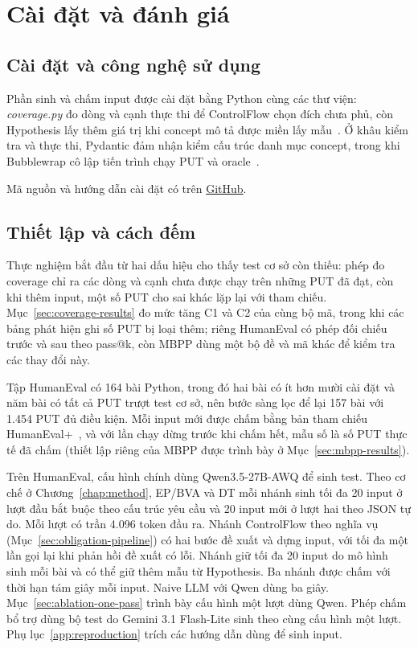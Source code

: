 \chapter{Cài đặt và đánh giá}
\label{chap:experiment}

\section{Cài đặt và công nghệ sử dụng}
\label{sec:related-technologies}

Phần sinh và chấm input được cài đặt bằng Python cùng các thư viện: \textit{coverage.py} đo dòng và cạnh thực thi để ControlFlow chọn đích chưa phủ, còn Hypothesis lấy thêm giá trị khi concept mô tả được miền lấy mẫu~\cite{coverageBranchDocs,hypothesisIntroDocs}. Ở khâu kiểm tra và thực thi, Pydantic đảm nhận kiểm cấu trúc danh mục concept, trong khi Bubblewrap cô lập tiến trình chạy PUT và oracle~\cite{pydanticModelsDocs,bubblewrapDocs}.

Mã nguồn và hướng dẫn cài đặt có trên \href{https://github.com/TranXuanPhong25/ConceptTesting}{GitHub}.

\section{Thiết lập và cách đếm}
\label{sec:experiment-data}

Thực nghiệm bắt đầu từ hai dấu hiệu cho thấy test cơ sở còn thiếu: phép đo coverage chỉ ra các dòng và cạnh chưa được chạy trên những PUT đã đạt, còn khi thêm input, một số PUT cho sai khác lặp lại với tham chiếu. Mục~\ref{sec:coverage-results} đo mức tăng C1 và C2 của cùng bộ mã, trong khi các bảng phát hiện ghi số PUT bị loại thêm; riêng HumanEval có phép đối chiếu trước và sau theo pass@k, còn MBPP dùng một bộ đề và mã khác để kiểm tra các thay đổi này.

Tập HumanEval có 164 bài Python, trong đó hai bài có ít hơn mười cài đặt và năm bài có tất cả PUT trượt test cơ sở, nên bước sàng lọc để lại 157 bài với 1.454 PUT đủ điều kiện. Mỗi input mới được chấm bằng bản tham chiếu HumanEval+~\cite{chen2021evaluating,liu2023evalplus}, và với lần chạy dừng trước khi chấm hết, mẫu số là số PUT thực tế đã chấm (thiết lập riêng của MBPP được trình bày ở Mục~\ref{sec:mbpp-results}).

Trên HumanEval, cấu hình chính dùng Qwen3.5-27B-AWQ để sinh test. Theo cơ chế ở Chương~\ref{chap:method}, EP/BVA và DT mỗi nhánh sinh tối đa 20 input ở lượt đầu bắt buộc theo cấu trúc yêu cầu và 20 input mới ở lượt hai theo JSON tự do. Mỗi lượt có trần 4.096 token đầu ra. Nhánh ControlFlow theo nghĩa vụ (Mục~\ref{sec:obligation-pipeline}) có hai bước đề xuất và dựng input, với tối đa một lần gọi lại khi phản hồi đề xuất có lỗi. Nhánh giữ tối đa 20 input do mô hình sinh mỗi bài và có thể giữ thêm mẫu từ Hypothesis. Ba nhánh được chấm với thời hạn tám giây mỗi input. Naive LLM với Qwen dùng ba giây. Mục~\ref{sec:ablation-one-pass} trình bày cấu hình một lượt dùng Qwen. Phép chấm bổ trợ dùng bộ test do Gemini 3.1 Flash-Lite sinh theo cùng cấu hình một lượt. Phụ lục~\ref{app:reproduction} trích các hướng dẫn dùng để sinh input.

